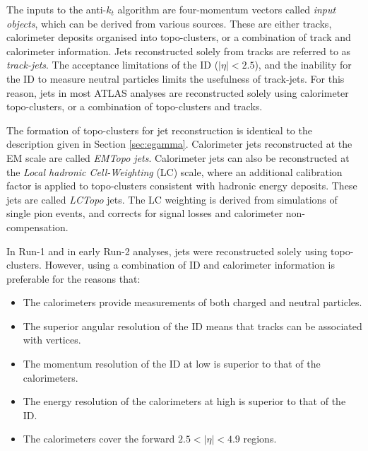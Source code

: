 The inputs to the anti-$k_t$ algorithm are four-momentum vectors called \textit{input objects}, which can be derived from various sources. These are either tracks, calorimeter deposits organised into topo-clusters, or a combination of track and calorimeter information. Jets reconstructed solely from tracks are referred to as \textit{track-jets}. The acceptance limitations of the ID ($|\eta|<2.5$), and the inability for the ID to measure neutral particles limits the usefulness of track-jets. For this reason, jets in most ATLAS analyses are reconstructed solely using calorimeter topo-clusters, or a combination of topo-clusters and tracks. 

The formation of topo-clusters for jet reconstruction is identical to the description given in Section \ref{sec:egamma}. Calorimeter jets reconstructed at the EM scale are called \textit{EMTopo jets}. Calorimeter jets can also be reconstructed at the \textit{Local hadronic Cell-Weighting} (LC) scale, where an additional calibration factor is applied to topo-clusters consistent with hadronic energy deposits. These jets are called \textit{LCTopo} jets. The LC weighting is derived from simulations of single pion events, and corrects for signal losses and calorimeter non-compensation.

In Run-1 and in early Run-2 analyses, jets were reconstructed solely using topo-clusters. However, using a combination of ID and calorimeter information is preferable for the reasons that:
\begin{itemize}
    \item The calorimeters provide measurements of both charged and neutral particles.
    \item The superior angular resolution of the ID means that tracks can be associated with vertices.
    \item The momentum resolution of the ID at low \et is superior to that of the calorimeters. 
    \item The energy resolution of the calorimeters at high \et is superior to that of the ID.
    \item The calorimeters cover the forward $2.5<|\eta|<4.9$ regions.
\end{itemize}

